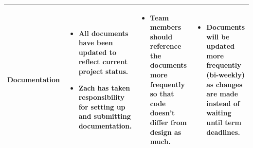 \documentclass[letterpaper,10pt,titlepage,draftclsnofoot,onecolumn,onesided] {IEEEtran}
\begin{document}
\begin{center}
\begin{singlespace}
\begin{tabular}{ |  p{0.25\linewidth}  |  p{0.25\linewidth}  | p{0.25\linewidth} | p{0.25\linewidth} |}
			Documentation 
		& 
			\begin{itemize}
				\item All documents have been updated to reflect current project status.
				\item Zach has taken responsibility for setting up and submitting documentation.
			\end{itemize}
		& 
			\begin{itemize}
				\item Team members should reference the documents more frequently so that code doesn't differ from design as much.
			\end{itemize}
		&
			\begin{itemize}
				\item Documents will be updated more frequently (bi-weekly) as changes are made instead of waiting until term deadlines.
			\end{itemize} 
		\\ \hline
		\end{tabular}
		\end{singlespace}
	\end{center}

\pagebreak


\end{document}
